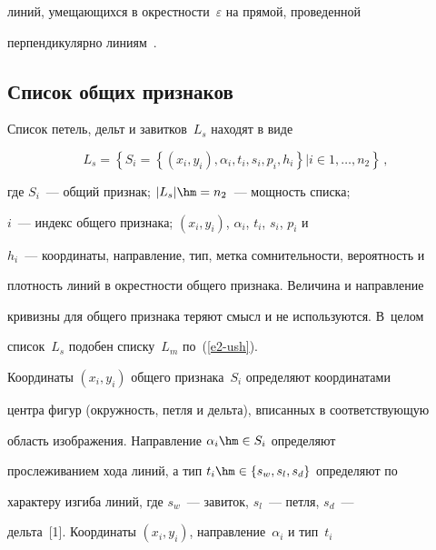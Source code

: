 линий, умещающихся в окрестности~$\varepsilon$ на прямой, проведенной 


перпендикулярно линиям~\cite{3-ush}.





\subsection{Список общих признаков} %





  Список петель, дельт и завитков~$L_s$ находят в виде


  \begin{equation*}


  L_s=\left\{ S_i=\left\{ (x_i,y_i),\alpha_i,t_i,s_i,p_i,h_i\right\}\vert i\in 1,\ldots , 


n_2\right\}\,,




  \end{equation*}


где $S_i$~---  общий признак; $\vert L_s\vert \hm= n_2$~---  мощность списка; 


$i$~---  индекс общего признака; $(x_i,y_i)$, $\alpha_i$, $t_i$, $s_i$, $p_i$ и 


$h_i$~---  координаты, направление, тип, метка сомнительности, вероятность и 


плотность линий в окрестности общего признака. Величина и направление 


кривизны для общего признака теряют смысл и не используются. В~целом 


список~$L_s$ подобен списку~$L_m$ по~(\ref{e2-ush}).


  


  Координаты $(x_i,y_i)$ общего признака~$S_i$ определяют координатами 


центра фигур (окружность, петля и дельта), вписанных в соответствующую 


область изображения. Направление $\alpha_i\hm\in S_i$ определяют 


прослеживанием хода линий, а тип $t_i\hm\in \{s_w,s_l,s_d\}$ определяют по 


характеру изгиба линий, где $s_w$~---  завиток, $s_l$~---   петля, $s_d$~---  


дельта~[1]. Координаты $(x_i,y_i)$, направление~$\alpha_i$ и тип~$t_i$ 


